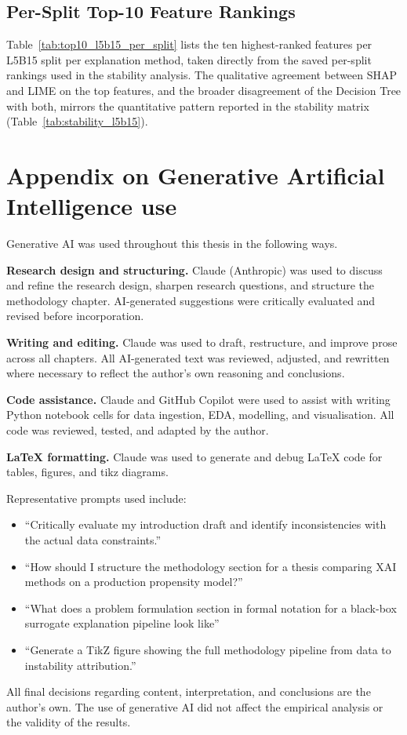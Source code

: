 \documentclass[oneside]{memoir} %
\begin{document}


\section{Per-Split Top-10 Feature Rankings} \label{app:top10_per_split}

Table~\ref{tab:top10_l5b15_per_split} lists the ten highest-ranked features per L5B15 split per explanation method, taken directly from the saved per-split rankings used in the stability analysis. The qualitative agreement between SHAP and LIME on the top features, and the broader disagreement of the Decision Tree with both, mirrors the quantitative pattern reported in the stability matrix (Table~\ref{tab:stability_l5b15}).



\newpage

\chapter{Appendix on Generative Artificial Intelligence use}

Generative AI was used throughout this thesis in the following ways.

\textbf{Research design and structuring.} Claude (Anthropic) was used to discuss and refine the research design, sharpen research questions, and structure the methodology chapter. AI-generated suggestions were critically evaluated and revised before incorporation.

\textbf{Writing and editing.} Claude was used to draft, restructure, and improve prose across all chapters. All AI-generated text was reviewed, adjusted, and rewritten where necessary to reflect the author's own reasoning and conclusions.

\textbf{Code assistance.} Claude and GitHub Copilot were used to assist with writing Python notebook cells for data ingestion, EDA, modelling, and visualisation. All code was reviewed, tested, and adapted by the author.

\textbf{LaTeX formatting.} Claude was used to generate and debug LaTeX code for tables, figures, and tikz diagrams.

\noindent Representative prompts used include:

\begin{itemize}
\item ``Critically evaluate my introduction draft and identify inconsistencies with the actual data constraints.''
\item ``How should I structure the methodology section for a thesis comparing XAI methods on a production propensity model?''
\item ``What does a problem formulation section in formal notation for a black-box surrogate explanation pipeline look like''
\item ``Generate a TikZ figure showing the full methodology pipeline from data to instability attribution.''
\end{itemize}

All final decisions regarding content, interpretation, and conclusions are the author's own. The use of generative AI did not affect the empirical analysis or the validity of the results.
\end{document}
